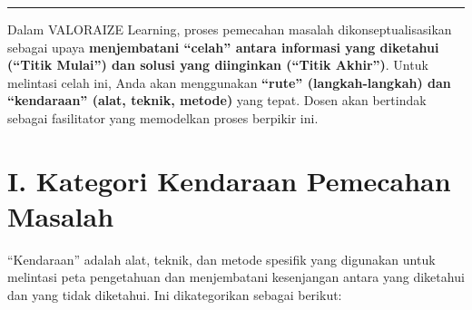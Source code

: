 \documentclass[
  letterpaper,
  DIV=11,
  numbers=noendperiod]{scrreprt}
\begin{document}
\begin{center}\rule{0.5\linewidth}{0.5pt}\end{center}

Dalam VALORAIZE Learning, proses pemecahan masalah dikonseptualisasikan
sebagai upaya \textbf{menjembatani ``celah'' antara informasi yang
diketahui (``Titik Mulai'') dan solusi yang diinginkan (``Titik
Akhir'')}. Untuk melintasi celah ini, Anda akan menggunakan
\textbf{``rute'' (langkah-langkah) dan ``kendaraan'' (alat, teknik,
metode)} yang tepat. Dosen akan bertindak sebagai fasilitator yang
memodelkan proses berpikir ini.

\section{\texorpdfstring{\textbf{I. Kategori Kendaraan Pemecahan
Masalah}}{I. Kategori Kendaraan Pemecahan Masalah}}\label{i.-kategori-kendaraan-pemecahan-masalah}

``Kendaraan'' adalah alat, teknik, dan metode spesifik yang digunakan
untuk melintasi peta pengetahuan dan menjembatani kesenjangan antara
yang diketahui dan yang tidak diketahui. Ini dikategorikan sebagai
berikut:
\end{document}
